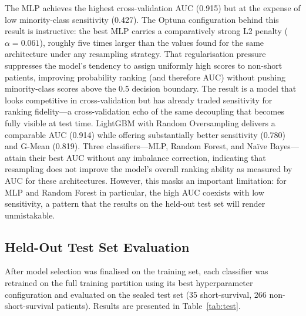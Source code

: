 \documentclass[a4paper,twoside]{article}
\begin{document}
The MLP achieves the highest cross-validation AUC (0.915) but at the expense of
low minority-class sensitivity (0.427). The Optuna configuration behind this
result is instructive: the best MLP carries a comparatively strong L2 penalty
($\alpha = 0.061$), roughly five times larger than the values found for the same
architecture under any resampling strategy. That regularisation pressure
suppresses the model's tendency to assign uniformly high scores to non-short
patients, improving probability ranking (and therefore AUC) without pushing
minority-class scores above the 0.5 decision boundary. The result is a model
that looks competitive in cross-validation but has already traded sensitivity for
ranking fidelity---a cross-validation echo of the same decoupling that becomes
fully visible at test time.
LightGBM with Random Oversampling delivers a comparable AUC (0.914) while
offering substantially better sensitivity (0.780) and G-Mean (0.819). Three
classifiers---MLP, Random Forest, and Naïve Bayes---attain their best AUC
without any imbalance correction, indicating that resampling does not improve
the model's overall ranking ability as measured by AUC for these architectures.
However, this masks an important limitation: for MLP and Random Forest in
particular, the high AUC coexists with low sensitivity, a pattern that the
results on the held-out test set will render unmistakable.

\subsection{Held-Out Test Set Evaluation}

After model selection was finalised on the training set, each classifier was
retrained on the full training partition using its best hyperparameter
configuration and evaluated on the sealed test set (35 short-survival,
266 non-short-survival patients). Results are presented in Table~\ref{tab:test}.
\end{document}
